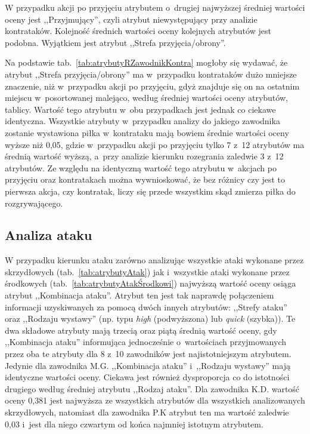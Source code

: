\documentclass[a4paper,twoside,12pt]{book}
\newcommand{\obcy}[1]{\emph{#1}}
\renewcommand{\ang}[1]{{\selectlanguage{british}\obcy{#1}}}
\begin{document}
W przypadku akcji po przyjęciu atrybutem o~drugiej najwyższej średniej wartości oceny jest ,,Przyjmujący'', czyli atrybut niewystępujący przy analizie kontrataków. Kolejność średnich wartości oceny kolejnych atrybutów jest podobna. Wyjątkiem jest atrybut ,,Strefa przyjęcia/obrony''.

Na podstawie tab.~\ref{tab:atrybutyRZawodnikKontra} mogłoby się wydawać, że atrybut ,,Strefa przyjęcia/obrony'' ma w~przypadku kontrataków dużo mniejsze znaczenie, niż w~przypadku akcji po przyjęciu, gdyż znajduje się on na ostatnim miejscu w~posortowanej malejąco, według średniej wartości oceny atrybutów, tablicy. Wartość tego atrybutu w~obu przypadkach jest jednak co ciekawe identyczna. Wszystkie atrybuty w~przypadku analizy do jakiego zawodnika zostanie wystawiona piłka w~kontrataku mają bowiem średnie wartości oceny wyższe niż 0,05, gdzie w~przypadku akcji po przyjęciu tylko 7 z~12 atrybutów ma średnią wartość wyższą, a~przy analizie kierunku rozegrania zaledwie 3 z~12 atrybutów. Ze względu na identyczną wartość tego atrybutu w~akcjach po przyjęciu oraz kontratakach można wywnioskować, że bez różnicy czy jest to pierwsza akcja, czy kontratak, liczy się przede wszystkim skąd zmierza piłka do rozgrywającego.


\subsection{Analiza ataku}

W przypadku kierunku ataku zarówno analizując wszystkie ataki wykonane przez skrzydłowych (tab.~\ref{tab:atrybutyAtak}) jak i~wszystkie ataki wykonane przez środkowych (tab.~\ref{tab:atrybutyAtakŚrodkowi}) najwyższą wartość oceny osiąga atrybut ,,Kombinacja ataku''. Atrybut ten jest tak naprawdę połączeniem informacji uzyskiwanych za pomocą dwóch innych atrybutów: ,,Strefy ataku'' oraz ,,Rodzaju wystawy'' (np. typu \ang{high} (podwyższona) lub \ang{quick} (szybka)). Te dwa składowe atrybuty mają trzecią oraz piątą średnią wartość oceny, gdy ,,Kombinacja ataku'' informująca jednocześnie o~wartościach przyjmowanych przez oba te atrybuty dla 8 z~10 zawodników jest najistotniejszym atrybutem. Jedynie dla zawodnika M.G. ,,Kombinacja ataku'' i~,,Rodzaju wystawy'' mają identyczne wartości oceny. Ciekawa jest również dysproporcja co do istotności drugiego według średniej atrybutu ,,Rodzaj ataku''. Dla zawodnika K.D. wartość oceny 0,381 jest najwyższa ze wszystkich atrybutów dla wszystkich analizowanych skrzydłowych, natomiast dla zawodnika P.K atrybut ten ma wartość zaledwie 0,03 i~jest dla niego czwartym od końca najmniej istotnym atrybutem.
\end{document}
